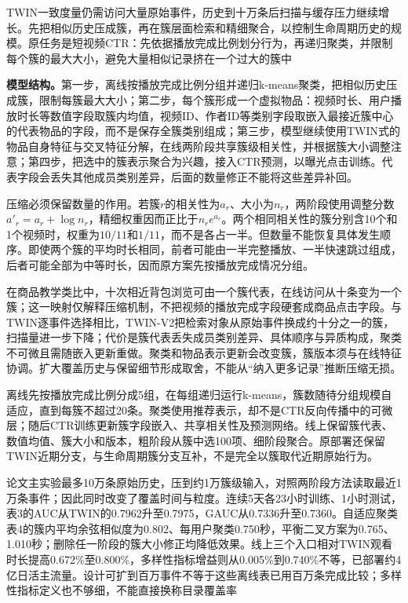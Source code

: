 TWIN一致度量仍需访问大量原始事件，历史到十万条后扫描与缓存压力继续增长。先把相似历史压成簇，再在簇层面检索和精细聚合，以控制生命周期历史的规模。原任务是短视频CTR：先依据播放完成比例划分行为，再递归聚类，并限制每个簇的最大大小，避免大量相似记录挤在一个过大的簇中

\textbf{模型结构。}第一步，离线按播放完成比例分组并递归k-means聚类，把相似历史压成簇，限制每簇最大大小；第二步，每个簇形成一个虚拟物品：视频时长、用户播放时长等数值字段取簇内均值，视频ID、作者ID等类别字段取嵌入最接近簇中心的代表物品的字段，而不是保存全簇类别组成；第三步，模型继续使用TWIN式的物品自身特征与交叉特征分解，在线两阶段共享簇级相关性，并根据簇大小调整注意；第四步，把选中的簇表示聚合为兴趣，接入CTR预测，以曝光点击训练。代表字段会丢失其他成员类别差异，后面的数量修正不能将这些差异补回。

压缩必须保留数量的作用。若簇$r$的相关性为$a_r$、大小为$n_r$，两阶段使用调整分数$a'_r=a_r+\log n_r$，精细权重因而正比于$n_r e^{a_r}$。两个相同相关性的簇分别含10个和1个视频时，权重为$10/11$和$1/11$，而不是各占一半。但数量不能恢复具体发生顺序。即使两个簇的平均时长相同，前者可能由一半完整播放、一半快速跳过组成，后者可能全部为中等时长，因而原方案先按播放完成情况分组。

在商品教学类比中，十次相近背包浏览可由一个簇代表，在线访问从十条变为一个簇；这一映射仅解释压缩机制，不把视频的播放完成字段硬套成商品点击字段。与TWIN逐事件选择相比，TWIN-V2把检索对象从原始事件换成约十分之一的簇，扫描量进一步下降；代价是簇代表丢失成员类别差异、具体顺序与异质构成，聚类不可微且需随嵌入更新重做。聚类和物品表示更新会改变簇，簇版本须与在线特征协调。扩大覆盖历史与保留细节形成取舍，不能从“纳入更多记录”推断压缩无损。

离线先按播放完成比例分成5组，在每组递归运行k-means，簇数随待分组规模自适应，直到每簇不超过20条。聚类使用推荐表示，却不是CTR反向传播中的可微层；随后CTR训练更新簇字段嵌入、共享相关性及预测网络。线上保留簇代表、数值均值、簇大小和版本，粗阶段从簇中选100项、细阶段聚合。原部署还保留TWIN近期分支，与生命周期簇分支互补，不是完全以簇取代近期原始行为。

论文主实验最多10万条原始历史，压到约1万簇级输入，对照两阶段方法读取最近1万条事件；因此同时改变了覆盖时间与粒度。连续5天各23小时训练、1小时测试，表3的AUC从TWIN的0.7962升至0.7975，GAUC从0.7336升至0.7360。自适应聚类表4的簇内平均余弦相似度为0.802、每用户聚类0.750秒，平衡二叉方案为0.765、1.010秒；删除任一阶段的簇大小修正均降低效果。线上三个入口相对TWIN观看时长提高0.672\%至0.800\%，多样性指标增益则从0.005\%到0.740\%不等，已部署约4亿日活主流量。设计可扩到百万事件不等于这些离线表已用百万条完成比较；多样性指标定义也不够细，不能直接换称目录覆盖率

